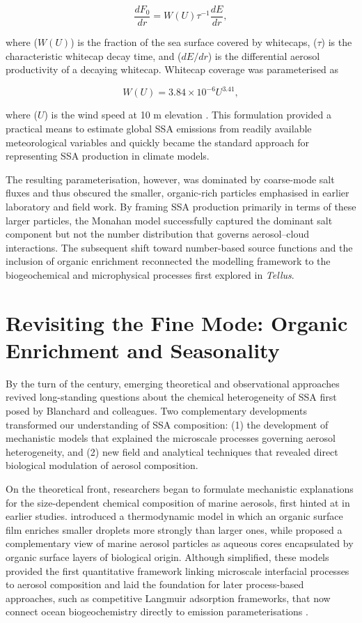 \documentclass[ProofPDF]{./Styles/Jnls-Template-V3}
\begin{document}
\begin{equation}
\frac{dF_0}{dr}=W(U)\tau^{-1}\frac{dE}{dr},
\end{equation}

where ($W(U)$) is the fraction of the sea surface covered by whitecaps, ($\tau$) is the characteristic whitecap decay time, and ($dE/dr$) is the differential aerosol productivity of a decaying whitecap. Whitecap coverage was parameterised as

\begin{equation}
W(U)=3.84\times10^{-6}U^{3.41},
\end{equation}

where ($U$) is the wind speed at 10 m elevation \citep{Monahan1986}. This formulation provided a practical means to estimate global SSA emissions from readily available meteorological variables and quickly became the standard approach for representing SSA production in climate models.

The resulting parameterisation, however, was dominated by coarse-mode salt fluxes and thus obscured the smaller, organic-rich particles emphasised in earlier laboratory and field work. By framing SSA production primarily in terms of these larger particles, the Monahan model successfully captured the dominant salt component but not the number distribution that governs aerosol–cloud interactions. The subsequent shift toward number-based source functions and the inclusion of organic enrichment reconnected the modelling framework to the biogeochemical and microphysical processes first explored in \textit{Tellus}.

\section{Revisiting the Fine Mode: Organic Enrichment and Seasonality}

By the turn of the century, emerging theoretical and observational approaches revived long-standing questions about the chemical heterogeneity of SSA first posed by Blanchard and colleagues. Two complementary developments transformed our understanding of SSA composition: (1) the development of mechanistic models that explained the microscale processes governing aerosol heterogeneity, and (2) new field and analytical techniques that revealed direct biological modulation of aerosol composition.

On the theoretical front, researchers began to formulate mechanistic explanations for the size-dependent chemical composition of marine aerosols, first hinted at in earlier studies. \citet{Oppo1999} introduced a thermodynamic model in which an organic surface film enriches smaller droplets more strongly than larger ones, while \citet{Ellison1999} proposed a complementary view of marine aerosol particles as aqueous cores encapsulated by organic surface layers of biological origin. Although simplified, these models provided the first quantitative framework linking microscale interfacial processes to aerosol composition and laid the foundation for later process-based approaches, such as competitive Langmuir adsorption frameworks, that now connect ocean biogeochemistry directly to emission parameterisations \citep[e.g.][]{Burrows2014}.
\end{document}
